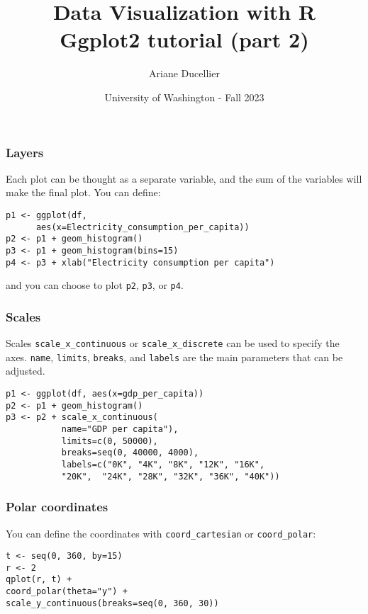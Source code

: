 \documentclass{beamer}
\title[Data Visualization with R - Ggplot2 tutorial (part 2)]{Data Visualization with R \\ Ggplot2 tutorial (part 2)}
\author{Ariane Ducellier}
\date{University of Washington - Fall 2023}
\begin{document}
	\begin{frame}
		\titlepage
	\end{frame}

	\begin{frame}[fragile]
		\frametitle{Layers}

		Each plot can be thought as a separate variable, and the sum of the variables will make the final plot. You can define:

		\vspace{2em}

		\begin{exampleblock}{}
		\begin{BVerbatim}
p1 <- ggplot(df,
      aes(x=Electricity_consumption_per_capita))
p2 <- p1 + geom_histogram()
p3 <- p1 + geom_histogram(bins=15)
p4 <- p3 + xlab("Electricity consumption per capita")
		\end{BVerbatim}
		\end{exampleblock}{}

		\vspace{2em}

		and you can choose to plot \verb|p2|, \verb|p3|, or \verb|p4|.

	\end{frame}

	\begin{frame}[fragile]
		\frametitle{Scales}

		Scales \verb|scale_x_continuous| or \verb|scale_x_discrete| can be used to specify the axes. \verb|name|, \verb|limits|, \verb|breaks|, and \verb|labels| are the main parameters that can be adjusted.

		\vspace{2em}

		\begin{exampleblock}{}
		\begin{BVerbatim}
p1 <- ggplot(df, aes(x=gdp_per_capita))
p2 <- p1 + geom_histogram()
p3 <- p2 + scale_x_continuous(
           name="GDP per capita"),
           limits=c(0, 50000),
           breaks=seq(0, 40000, 4000),
           labels=c("0K", "4K", "8K", "12K", "16K",
           "20K",  "24K", "28K", "32K", "36K", "40K"))
		\end{BVerbatim}
		\end{exampleblock}{}

	\end{frame}

	\begin{frame}[fragile]
		\frametitle{Polar coordinates}

		You can define the coordinates with \verb|coord_cartesian| or \verb|coord_polar|:

		\vspace{2em}

		\begin{exampleblock}{}
		\begin{BVerbatim}
t <- seq(0, 360, by=15)
r <- 2
qplot(r, t) +
coord_polar(theta="y") +
scale_y_continuous(breaks=seq(0, 360, 30))
		\end{BVerbatim}
		\end{exampleblock}{}

	\end{frame}
\end{document}
